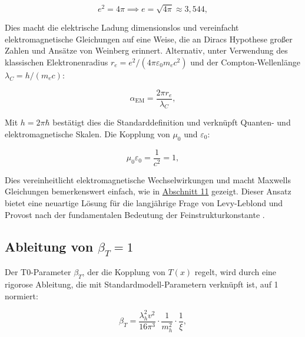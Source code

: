 \documentclass[twocolumn,aps,prl]{revtex4-2}
\begin{document}
{{{{{{{{{										\begin{equation}
											e^2 = 4 \pi \implies e = \sqrt{4 \pi} \approx 3{,}544, \label{eq:charge_value}
										\end{equation}
										
										Dies macht die elektrische Ladung dimensionslos und vereinfacht elektromagnetische Gleichungen auf eine Weise, die an Diracs Hypothese großer Zahlen \cite{Dirac1937} und Ansätze von Weinberg \cite{Weinberg1983} erinnert. Alternativ, unter Verwendung des klassischen Elektronenradius \(r_e = e^2/(4 \pi \varepsilon_0 m_e c^2)\) und der Compton-Wellenlänge \(\lambda_C = h/(m_e c)\):
										
										\begin{equation}
											\alpha_{\text{EM}} = \frac{2 \pi r_e}{\lambda_C}, \label{eq:alpha_alt}
										\end{equation}
										
										Mit \(h = 2 \pi \hbar\) bestätigt dies die Standarddefinition und verknüpft Quanten- und elektromagnetische Skalen. Die Kopplung von \(\mu_0\) und \(\varepsilon_0\):
										
										\begin{equation}
											\mu_0 \varepsilon_0 = \frac{1}{c^2} = 1, \label{eq:em_coupling}
										\end{equation}
										
										Dies vereinheitlicht elektromagnetische Wechselwirkungen und macht Maxwells Gleichungen bemerkenswert einfach, wie in \hyperref[subsec:detailed_em_constants]{Abschnitt 11} gezeigt. Dieser Ansatz bietet eine neuartige Lösung für die langjährige Frage von Levy-Leblond und Provost nach der fundamentalen Bedeutung der Feinstrukturkonstante \cite{LevyLeblond1979}.
										
										\subsection{Ableitung von \(\beta_T = 1\)}
										\label{subsec:beta_derivation}
										
										Der T0-Parameter \(\beta_T\), der die Kopplung von \(T(x)\) regelt, wird durch eine rigorose Ableitung, die mit Standardmodell-Parametern verknüpft ist, auf 1 normiert:
										
										\begin{equation}
											\beta_T = \frac{\lambda_h^2 v^2}{16 \pi^3} \cdot \frac{1}{m_h^2} \cdot \frac{1}{\xi}, \label{eq:beta_derivation}
										\end{equation}
										
}}}}}}}}}
\end{document}
